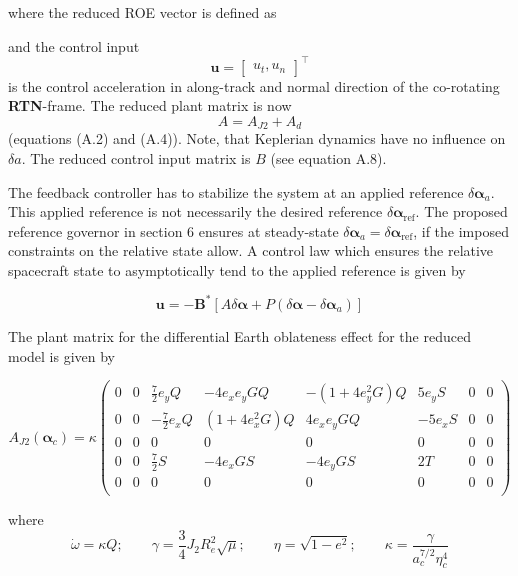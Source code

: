 where the reduced ROE vector is defined as 

and the control input 
\[
\bm{u} = \begin{bmatrix} u_t, u_n \end{bmatrix}^\top
\]
is the control acceleration in along-track and normal direction of the co-rotating \textbf{RTN}-frame. The reduced plant matrix is now 
\[
A = A_{J2} + A_d
\]
(equations (A.2) and (A.4)). Note, that Keplerian dynamics have no influence on $\delta a$. The reduced control input matrix is $B$ (see equation A.8).


The feedback controller has to stabilize the system at an applied reference $\delta \boldsymbol{\alpha}_a$. This applied reference is not necessarily the desired reference $\delta \boldsymbol{\alpha}_{\text{ref}}$. The proposed reference governor in section 6 ensures at steady-state $\delta \boldsymbol{\alpha}_a = \delta \boldsymbol{\alpha}_{\text{ref}}$, if the imposed constraints on the relative state allow. A control law which ensures the relative spacecraft state to asymptotically tend to the applied reference is given by

\begin{equation}
\mathbf{u} = -\mathbf{B}^* \left[ A \delta \boldsymbol{\alpha} + P \left( \delta \boldsymbol{\alpha} - \delta \boldsymbol{\alpha}_a \right) \right]
\tag{4.1}
\end{equation}

The plant matrix for the differential Earth oblateness effect for the reduced model is given by

\begin{equation}
A_{J2}(\bm{\alpha}_c) = \kappa
\begin{pmatrix}
0 & 0 & \frac{7}{2} e_y Q & -4 e_x e_y G Q & -(1 + 4 e_y^2 G) Q & 5 e_y S & 0 & 0 \\
0 & 0 & -\frac{7}{2} e_x Q & (1 + 4 e_x^2 G) Q & 4 e_x e_y G Q & -5 e_x S & 0 & 0 \\
0 & 0 & 0 & 0 & 0 & 0 & 0 & 0 \\
0 & 0 & \frac{7}{2} S & -4 e_x G S & -4 e_y G S & 2 T & 0 & 0 \\
0 & 0 & 0 & 0 & 0 & 0 & 0 & 0 \\
\end{pmatrix}
\tag{A.2}
\end{equation}

\noindent where
\[
\dot{\omega} = \kappa Q; \qquad \gamma = \frac{3}{4} J_2 R_e^2 \sqrt{\mu}; \qquad \eta = \sqrt{1 - e^2}; \qquad \kappa = \frac{\gamma}{a_c^{7/2} \eta_c^4}
\]

